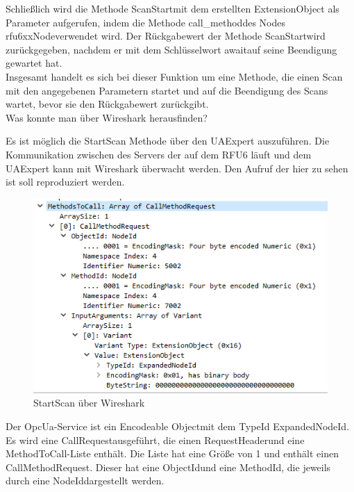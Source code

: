 Schließlich wird die Methode \dq ScanStart\dq  mit dem erstellten ExtensionObject als Parameter aufgerufen, indem die Methode \dq call\_method\dq  des Nodes \dq rfu6xxNode\dq  verwendet wird. Der Rückgabewert der Methode \dq ScanStart\dq  wird zurückgegeben, nachdem er mit dem Schlüsselwort \dq await\dq  auf seine Beendigung gewartet hat.\\

Insgesamt handelt es sich bei dieser Funktion um eine Methode, die einen Scan mit den angegebenen Parametern startet und auf die Beendigung des Scans wartet, bevor sie den Rückgabewert zurückgibt.\\

Was konnte man über Wireshark herausfinden?

Es ist möglich die StartScan Methode über den UAExpert auszuführen. Die Kommunikation zwischen des Servers der auf dem RFU6 läuft und dem UAExpert kann mit Wireshark überwacht werden. Den Aufruf der hier zu sehen ist soll reproduziert werden.


\begin{figure}[H]
    \centering
    \includegraphics[width=(\textwidth/2)]{Bild/StartScabWireshark.PNG}
    \caption{StartScan über Wireshark}
    \label{fig:StartScanueberWireshark}
\end{figure}

Der OpcUa-Service ist ein \dq Encodeable Object\dq  mit dem TypeId \dq ExpandedNodeId\dq . Es wird eine \dq CallRequest\dq  ausgeführt, die einen \dq RequestHeader\dq  und eine \dq MethodToCall\dq -Liste enthält. Die Liste hat eine Größe von 1 und enthält einen \dq CallMethodRequest\dq . Dieser hat eine \dq ObjectId\dq  und eine \dq MethodId\dq , die jeweils durch eine \dq NodeId\dq  dargestellt werden.\\


